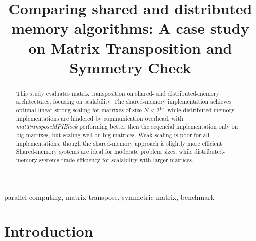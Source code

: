 \documentclass[conference]{IEEEtran}
\begin{document}
\title{Comparing shared and distributed memory algorithms: A case study on Matrix Transposition and Symmetry Check\\
}

\author{
}

\maketitle

\begin{abstract}
This study evaluates matrix transposition on shared- and distributed-memory
architectures, focusing on scalability. The shared-memory implementation
achieves optimal linear strong scaling for matrixes of size $N<2^{10}$,
while distributed-memory implementations are hindered by communication overhead, with
\textit{matTransposeMPIBlock} performing better then the seqencial
implementation only on big matrixes, but scaling well on big matrices.
Weak scaling is poor for all implementations, though the shared-memory
approach is slightly more efficient. Shared-memory systems are ideal
for moderate problem sizes, while distributed-memory systems trade
efficiency for scalability with larger matrices.
\end{abstract}

\begin{IEEEkeywords}
parallel computing, matrix transpose, symmetric matrix, benchmark
\end{IEEEkeywords}

\section{Introduction}
\end{document}
